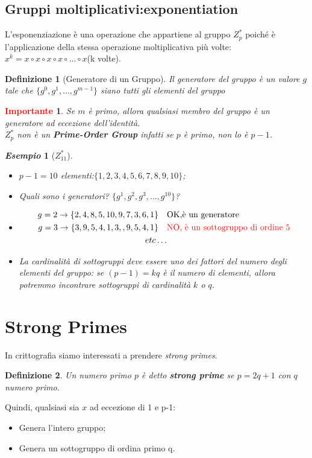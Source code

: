 \documentclass{book}
\newtheorem{Definizione}{\textbf{Definizione}}
\newtheorem*{Importante}{\textbf{\textcolor{red}{Importante}}}
\newtheorem{esempio}{\emph{Esempio}}
\begin{document}
\subsection{Gruppi moltiplicativi:exponentiation}
L'esponenziazione è una operazione che appartiene al gruppo \(Z_{p}^{*}\) poiché è l'applicazione della stessa operazione moltiplicativa più volte:\(x^{k}=x\circ x\circ x\circ x\circ \ldots \circ x\)(k volte).
\begin{Definizione}[Generatore di un Gruppo]
	Il generatore del gruppo è un valore \(g\) tale che \( \{g^{0},g^{1},\ldots ,g^{m-1} \} \) siano tutti gli elementi del gruppo
\end{Definizione}
\begin{Importante}
	Se \(m\) è primo, allora qualsiasi membro del gruppo è un generatore ad eccezione dell'identità\@.\\
	\(Z_{p}^{*}\) non è un \textbf{Prime-Order Group} infatti se \(p\) è primo, non lo è \(p-1\).
\end{Importante}
\newpage
\begin{esempio}[\(Z_{11}^{*}\)]
	\begin{itemize}
		\item \(p-1=10\) elementi:\( \{1,2,3,4,5,6,7,8,9,10 \} \);
		\item Quali sono i generatori? \( \{g^{1},g^{2},g^{3},\ldots ,g^{10}\} \)?
		\item \begin{align*}
			      g=2\rightarrow \{2,4,8,5,10,9,7,3,6,1\}\quad & \text{OK,è un generatore}                                \\
			      g=3\rightarrow \{3,9,5,4,1,3,,9,5,4,1\}\quad & \text{\textcolor{red}{NO, è un sottogruppo di ordine 5}} \\
			      etc\ldots
		      \end{align*}
		\item La cardinalità di sottogruppi deve essere uno dei fattori del numero degli elementi del gruppo: se \((p-1)=kq\) è il numero di elementi, allora potremmo incontrare sottogruppi di cardinalità \(k\) o \(q\).
	\end{itemize}
\end{esempio}
\section{Strong Primes}
In crittografia siamo interessati a prendere \emph{strong primes}.
\begin{Definizione}
	Un numero primo \(p\) è detto \textbf{strong prime} se \(p=2q+1\) con \(q\) numero primo.
\end{Definizione}
Quindi, qualsiasi sia \(x\) ad eccezione di 1 e p-1:\begin{itemize}
	\item Genera l'intero gruppo;
	\item Genera un sottogruppo di ordina primo q.
\end{itemize}
\end{document}
